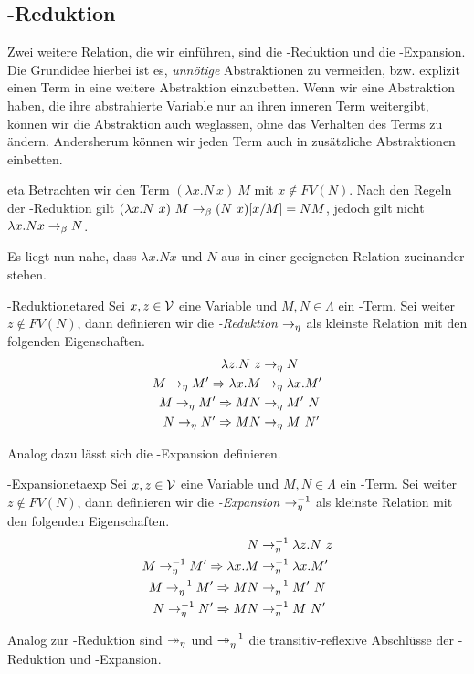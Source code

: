 \subsection{\teta-Reduktion}
Zwei weitere Relation, die wir einführen, sind die \teta-Reduktion und die \teta-Expansion. Die Grundidee hierbei ist es, \emph{unnötige} Abstraktionen zu vermeiden, bzw. explizit einen Term in eine weitere Abstraktion einzubetten. Wenn wir eine Abstraktion haben, die ihre abstrahierte Variable nur an ihren inneren Term weitergibt, können wir die Abstraktion auch weglassen, ohne das Verhalten des Terms zu ändern. Andersherum können wir jeden Term auch in zusätzliche Abstraktionen einbetten.
\begin{example}{}{eta}
    Betrachten wir den Term $(\lambda x.N~x)~M$ mit $x\notin FV(N)$. Nach den Regeln der \tbeta-Reduktion gilt $(\lambda x.N~x)~M\rightarrow_\beta (N~x)[x/M] = N M$, jedoch gilt nicht $\lambda x.N x \rightarrow_\beta N$. 
\end{example}
Es liegt nun nahe, dass $\lambda x.N x$ und $N$ aus  in einer geeigneten Relation zueinander stehen.
\begin{definition}{\teta-Reduktion}{etared}
    Sei $x,z\in\mathcal{V}$ eine Variable und $M,N\in\Lambda$ ein \tlambda-Term. Sei weiter $z\notin FV(N)$, dann definieren wir die \emph{\teta-Reduktion} $\rightarrow_\eta$ als kleinste Relation mit den folgenden Eigenschaften.
    \begin{align*}
    \lambda z.N~z &\rightarrow_\eta N\\
    M\rightarrow_\eta M' \Rightarrow \lambda x.M&\rightarrow_\eta \lambda x.M'\\
    M\rightarrow_\eta M' \Rightarrow  M N&\rightarrow_\eta M'~N\\
    N\rightarrow_\eta N' \Rightarrow  M N&\rightarrow_\eta M~N'        
    \end{align*}
\end{definition}
Analog dazu lässt sich die \teta-Expansion definieren.
\begin{definition}{\teta-Expansion}{etaexp}
    Sei $x,z\in\mathcal{V}$ eine Variable und $M,N\in\Lambda$ ein \tlambda-Term. Sei weiter $z\notin FV(N)$, dann definieren wir die \emph{\teta-Expansion} $\rightarrow_\eta^{-1}$ als kleinste Relation mit den folgenden Eigenschaften.
    \begin{align*}
    N &\rightarrow_\eta^{-1} \lambda z.N~z\\
    M\rightarrow_\eta^{-1} M' \Rightarrow \lambda x.M&\rightarrow_\eta^{-1} \lambda x.M'\\
    M\rightarrow_\eta^{-1} M' \Rightarrow  M N&\rightarrow_\eta^{-1} M'~N\\
    N\rightarrow_\eta^{-1} N' \Rightarrow  M N&\rightarrow_\eta^{-1} M~N'        
    \end{align*}
\end{definition}
\begin{remark}
    Analog zur \tbeta-Reduktion sind $\twoheadrightarrow_\eta$ und $\twoheadrightarrow_\eta^{-1}$ die transitiv-reflexive Abschlüsse der \teta-Reduktion und \teta-Expansion.
\end{remark}

